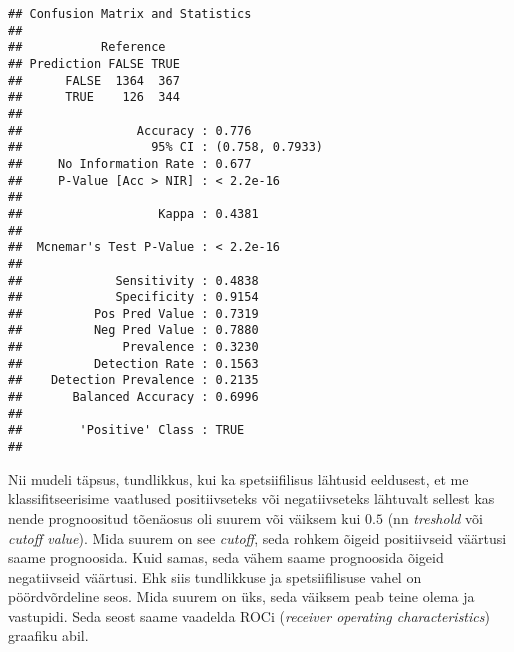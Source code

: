 \documentclass[
]{book}
\newenvironment{Shaded}{\begin{snugshade}}{\end{snugshade}}
\newcommand{\AttributeTok}[1]{\textcolor[rgb]{0.77,0.63,0.00}{#1}}
\newcommand{\CommentTok}[1]{\textcolor[rgb]{0.56,0.35,0.01}{\textit{#1}}}
\newcommand{\FunctionTok}[1]{\textcolor[rgb]{0.00,0.00,0.00}{#1}}
\newcommand{\NormalTok}[1]{#1}
\newcommand{\OtherTok}[1]{\textcolor[rgb]{0.56,0.35,0.01}{#1}}
\newcommand{\SpecialCharTok}[1]{\textcolor[rgb]{0.00,0.00,0.00}{#1}}
\newcommand{\StringTok}[1]{\textcolor[rgb]{0.31,0.60,0.02}{#1}}
\begin{document}
\begin{verbatim}
## Confusion Matrix and Statistics
## 
##           Reference
## Prediction FALSE TRUE
##      FALSE  1364  367
##      TRUE    126  344
##                                          
##                Accuracy : 0.776          
##                  95% CI : (0.758, 0.7933)
##     No Information Rate : 0.677          
##     P-Value [Acc > NIR] : < 2.2e-16      
##                                          
##                   Kappa : 0.4381         
##                                          
##  Mcnemar's Test P-Value : < 2.2e-16      
##                                          
##             Sensitivity : 0.4838         
##             Specificity : 0.9154         
##          Pos Pred Value : 0.7319         
##          Neg Pred Value : 0.7880         
##              Prevalence : 0.3230         
##          Detection Rate : 0.1563         
##    Detection Prevalence : 0.2135         
##       Balanced Accuracy : 0.6996         
##                                          
##        'Positive' Class : TRUE           
## 
\end{verbatim}

Nii mudeli täpsus, tundlikkus, kui ka spetsiifilisus lähtusid eeldusest, et me klassifitseerisime vaatlused positiivseteks või negatiivseteks lähtuvalt sellest kas nende prognoositud tõenäosus oli suurem või väiksem kui \(0.5\) (nn \emph{treshold} või \emph{cutoff value}). Mida suurem on see \emph{cutoff}, seda rohkem õigeid positiivseid väärtusi saame prognoosida. Kuid samas, seda vähem saame prognoosida õigeid negatiivseid väärtusi. Ehk siis tundlikkuse ja spetsiifilisuse vahel on pöördvõrdeline seos. Mida suurem on üks, seda väiksem peab teine olema ja vastupidi. Seda seost saame vaadelda ROCi (\emph{receiver operating characteristics}) graafiku abil.

\begin{Shaded}
\end{Shaded}
\end{document}
